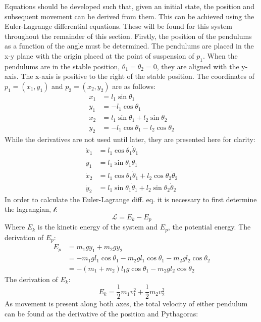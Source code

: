 Equations should be developed such that, given an initial state, the position and subsequent movement can be derived from them.
This can be achieved using the Euler-Lagrange differential equations.
These will be found for this system throughout the remainder of this section.
Firstly, the position of the pendulums as a function of the angle must be determined.
The pendulums are placed in the x-y plane with the origin placed at the point of suspension of $p_1$.
When the pendulums are in the stable position, $\theta_1=\theta_2=0$, they are aligned with the y-axis.
The x-axis is positive to the right of the stable position.
The coordinates of $p_1=(x_1,y_1)$ and $p_2=(x_2,y_2)$ are as follows:
\begin{align}
	x_1 &= l_1\sin{\theta_1}\\
	y_1 &= -l_1\cos{\theta_1}\\
	x_2 &= l_1\sin{\theta_1} + l_2\sin{\theta_2}\\
	y_2 &= -l_1\cos{\theta_1} - l_2\cos{\theta_2}
\end{align}
While the derivatives are not used until later, they are presented here for clarity:
\begin{align}
	\dot{x}_1 &= l_1\cos{\theta}_1\dot{\theta}_1\\
	\dot{y}_1 &= l_1\sin{\theta}_1\dot{\theta}_1\\
	\dot{x}_2 &= l_1\cos{\theta}_1\dot{\theta}_1 + l_2\cos{\theta_2}\dot{\theta}_2\\
	\dot{y}_2 &= l_1\sin{\theta}_1\dot{\theta}_1 + l_2\sin{\theta_2}\dot{\theta}_2
\end{align}
In order to calculate the Euler-Lagrange diff. eq. it is necessary to first determine the lagrangian, $\mathcal{l}$:
\begin{equation}
	\mathcal{L}=E_k-E_p
\end{equation}
Where $E_k$ is the kinetic energy of the system and $E_p$, the potential energy.
The derivation of $E_p$:
\begin{align}
	E_p &= m_1 g y_1 + m_2 g y_2\\
		&= -m_1 g l_1 \cos{\theta_1} - m_2 g l_1 \cos{\theta_1} - m_2 g l_2 \cos{\theta_2}\\
		&= -(m_1+m_2)l_1g \cos{\theta_1}-m_2 g l_2 \cos{\theta_2}
		\label{eq:ep}
\end{align}
The derivation of $E_k$:
\begin{equation}
	\label{eq:ek}
	E_k = \frac{1}{2}m_1v_1^2+\frac{1}{2}m_2v_2^2
\end{equation}
As movement is present along both axes, the total velocity of either pendulum can be found as the derivative of the position and Pythagoras:
